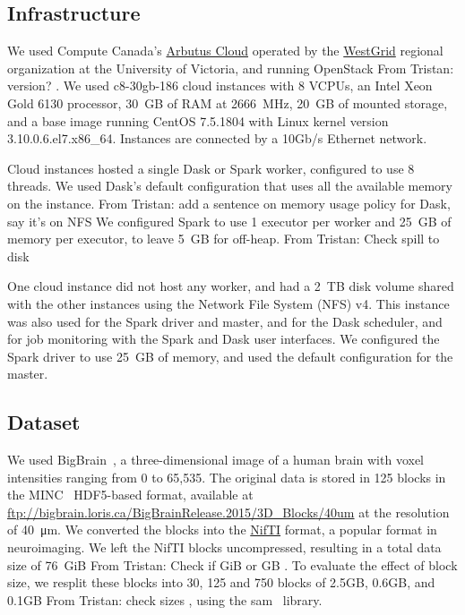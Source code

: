 \documentclass[conference]{IEEEtran}
\newcommand{\TG}[1]{\color{cyan}From Tristan: #1 \color{black}}
\begin{document}
\subsection{Infrastructure}

 We used Compute Canada's
 \href{https://docs.computecanada.ca/wiki/Cloud_resources}{Arbutus Cloud}
 operated by the \href{https://www.westgrid.ca}{WestGrid} regional
 organization at the University of Victoria, and running OpenStack
 \TG{version?}. We used c8-30gb-186 cloud instances with 8 VCPUs, an Intel
 Xeon Gold 6130 processor, 30~GB of RAM at 2666~MHz, 20~GB of mounted
 storage, and a base image running CentOS 7.5.1804 with  Linux kernel
 version
 3.10.0.6.el7.x86\_64. Instances are connected by a 10Gb/s Ethernet network. 
 
 Cloud instances hosted a single Dask or Spark worker, configured to use 8
 threads. We used Dask's default configuration that uses all the available
 memory on the instance. \TG{add a sentence on memory usage policy for Dask, say it's on NFS} We
 configured Spark to use 1 executor per worker and 25~GB of memory per
 executor, to leave 5~GB for off-heap. \TG{Check spill to disk}
 
 One cloud instance did not host any worker, and had a 2~TB disk volume
 shared with the other instances using the Network File System (NFS) v4.
 This instance was also used for the Spark driver and master, and for the
 Dask scheduler, and for job monitoring with the Spark and Dask user
 interfaces. We configured the Spark driver to use 25~GB of memory, and
 used the default configuration for the master.

\subsection{Dataset}

We used BigBrain~\cite{Amunts:13}, a three-dimensional image of a human
brain with voxel intensities ranging from 0 to 65,535. The original data is
stored in 125 blocks in the MINC~\cite{minc} HDF5-based format, available
at \url{ftp://bigbrain.loris.ca/BigBrainRelease.2015/3D_Blocks/40um} at the
resolution of \SI{40}{\micro\metre}. We converted the blocks into the
\href{https://nifti.nimh.nih.gov/nifti-1}{NifTI} format, a popular format
in neuroimaging. We left the NifTI blocks uncompressed, resulting in 
a total data size of 76~GiB \TG{Check if GiB or GB}. 
To evaluate the effect of block size, we resplit these blocks into 30, 125 and 750 blocks of 
2.5GB, 0.6GB, and
0.1GB \TG{check sizes}, using the sam~\cite{sam} library.
\end{document}
